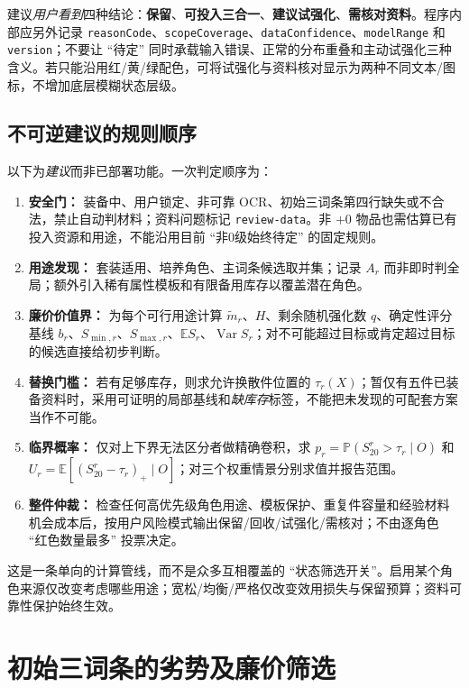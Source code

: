 \documentclass[11pt,a4paper]{ctexart}
\newcommand{\Var}{\operatorname{Var}}
\newcommand{\E}{\mathbb E}
\newcommand{\Prob}{\mathbb P}
\begin{document}
建议\emph{用户看到}四种结论：\textbf{保留}、\textbf{可投入三合一}、\textbf{建议试强化}、\textbf{需核对资料}。程序内部应另外记录 \texttt{reasonCode}、\texttt{scopeCoverage}、\texttt{dataConfidence}、\texttt{modelRange} 和 \texttt{version}；不要让 ``待定'' 同时承载输入错误、正常的分布重叠和主动试强化三种含义。若只能沿用红/黄/绿配色，可将试强化与资料核对显示为两种不同文本/图标，不增加底层模糊状态层级。

\subsection{不可逆建议的规则顺序}
以下为\emph{建议}而非已部署功能。一次判定顺序为：
\begin{enumerate}
\item \textbf{安全门：} 装备中、用户锁定、非可靠 OCR、初始三词条第四行缺失或不合法，禁止自动判材料；资料问题标记 \texttt{review-data}。非 $+0$ 物品也需估算已有投入资源和用途，不能沿用目前 ``非0级始终待定'' 的固定规则。
\item \textbf{用途发现：} 套装适用、培养角色、主词条候选取并集；记录 $A_r$ 而非即时判全局；额外引入稀有属性模板和有限备用库存以覆盖潜在角色。
\item \textbf{廉价价值界：} 为每个可行用途计算 $\widetilde m_r$、$H$、剩余随机强化数 $q$、确定性评分基线 $b_r$、$S_{\min,r}$、$S_{\max,r}$、$\E S_r$、$\Var S_r$；对不可能超过目标或肯定超过目标的候选直接给初步判断。
\item \textbf{替换门槛：} 若有足够库存，则求允许换散件位置的 $\tau_r(X)$；暂仅有五件已装备资料时，采用可证明的局部基线和\emph{缺库存}标签，不能把未发现的可配套方案当作不可能。
\item \textbf{临界概率：} 仅对上下界无法区分者做精确卷积，求 $p_r=\Prob(S^r_{20}>\tau_r\mid O)$ 和 $U_r=\E[(S^r_{20}-\tau_r)_+\mid O]$；对三个权重情景分别求值并报告范围。
\item \textbf{整件仲裁：} 检查任何高优先级角色用途、模板保护、重复件容量和经验材料机会成本后，按用户风险模式输出保留/回收/试强化/需核对；不由逐角色 ``红色数量最多'' 投票决定。
\end{enumerate}
这是一条单向的计算管线，而不是众多互相覆盖的 ``状态筛选开关''。启用某个角色来源仅改变考虑哪些用途；宽松/均衡/严格仅改变效用损失与保留预算；资料可靠性保护始终生效。

\section{初始三词条的劣势及廉价筛选}
\end{document}
